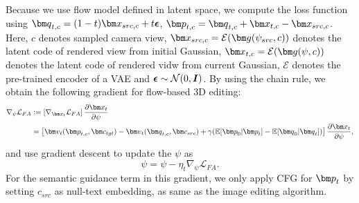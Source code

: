 Because we use flow model defined in latent space, we compute the loss function using
$\vq_{t,c}= (1-t)\vx_{src, c} + t\epsilonb$, $\vp_{t,c} = \vq_{t,c} + \vx_{t,c} - \vx_{src, c}$.
Here, $c$ denotes sampled camera view, $\vx_{src, c} = \mathcal{E}(\vg(\psi_{src}, c))$ denotes the latent code of rendered view from initial Gaussian,  $\vx_{t, c} = \mathcal{E}(\vg(\psi, c))$ denotes the latent code of rendered vidw from current Gaussian, $\mathcal{E}$ denotes the pre-trained encoder of a VAE and ${\boldsymbol \epsilon} \sim \mathcal{N}(0, \boldsymbol{I})$.
 By using the chain rule, we obtain the following gradient for flow-based 3D editing:
\begin{align}
\nabla_{\psi} \mathcal{L}_{FA} &:=\left[  \nabla_{\vx_t}\mathcal{L}_{FA}\right]\frac{\partial \vx_t}{\partial \psi}\\
& = \left[\vv_t(\vp_{t,c}, \vc_{tgt}) - \vv_t(\vq_{t,c}, \vc_{src}) +\gamma 
(\mathbb{E}[\vp_0|\vp_t] - \mathbb{E}[\vq_0|\vq_t])\right] \frac{\partial \vx_t}{\partial \psi},
\label{eqn:gauss_grad}
\end{align}
and use gradient descent to update the $\psi$ as 
\begin{equation}
    \psi = \psi - \eta_t \nabla_\psi \mathcal{L}_{FA}.
\end{equation}
For the semantic guidance term in this gradient, we only apply CFG for $\vp_t$ by setting $c_{src}$ as null-text embedding, as same as the image editing algorithm.

